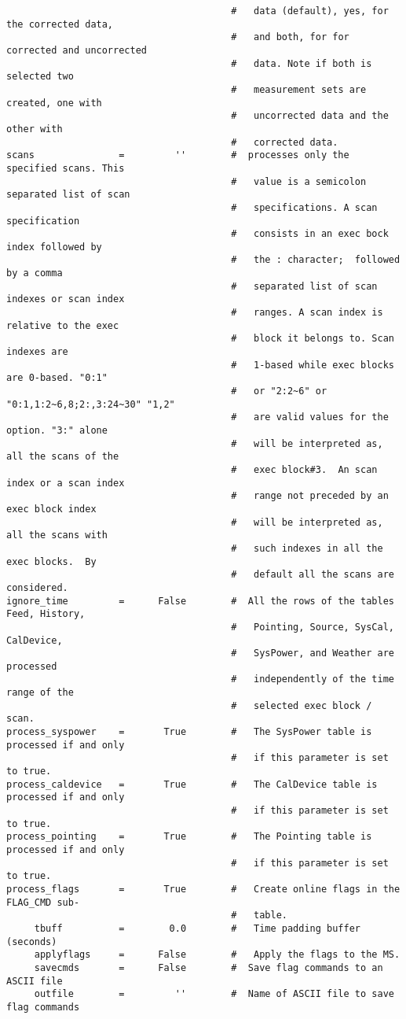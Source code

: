 \begin{verbatim}
                                        #   data (default), yes, for the corrected data,
                                        #   and both, for for corrected and uncorrected
                                        #   data. Note if both is selected two
                                        #   measurement sets are created, one with
                                        #   uncorrected data and the other with
                                        #   corrected data.
scans               =         ''        #  processes only the specified scans. This
                                        #   value is a semicolon separated list of scan
                                        #   specifications. A scan specification
                                        #   consists in an exec bock index followed by
                                        #   the : character;  followed by a comma
                                        #   separated list of scan indexes or scan index
                                        #   ranges. A scan index is relative to the exec
                                        #   block it belongs to. Scan indexes are
                                        #   1-based while exec blocks are 0-based. "0:1"
                                        #   or "2:2~6" or "0:1,1:2~6,8;2:,3:24~30" "1,2"
                                        #   are valid values for the option. "3:" alone
                                        #   will be interpreted as, all the scans of the
                                        #   exec block#3.  An scan index or a scan index
                                        #   range not preceded by an exec block index
                                        #   will be interpreted as, all the scans with
                                        #   such indexes in all the exec blocks.  By
                                        #   default all the scans are considered.
ignore_time         =      False        #  All the rows of the tables Feed, History,
                                        #   Pointing, Source, SysCal, CalDevice,
                                        #   SysPower, and Weather are processed
                                        #   independently of the time range of the
                                        #   selected exec block / scan.
process_syspower    =       True        #   The SysPower table is processed if and only
                                        #   if this parameter is set to true.
process_caldevice   =       True        #   The CalDevice table is processed if and only
                                        #   if this parameter is set to true.
process_pointing    =       True        #   The Pointing table is processed if and only
                                        #   if this parameter is set to true.
process_flags       =       True        #   Create online flags in the FLAG_CMD sub-
                                        #   table.
     tbuff          =        0.0        #   Time padding buffer (seconds)
     applyflags     =      False        #   Apply the flags to the MS.
     savecmds       =      False        #  Save flag commands to an ASCII file
     outfile        =         ''        #  Name of ASCII file to save flag commands


\end{verbatim}
